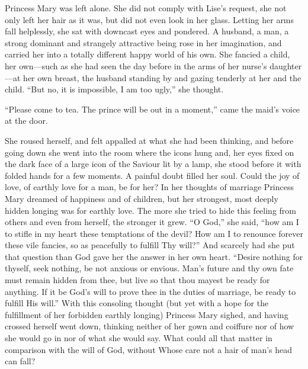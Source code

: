 Princess Mary was left alone. She did not comply with Lise's
request, she not only left her hair as it was, but did not even
look in her glass. Letting her arms fall helplessly, she sat with
downcast eyes and pondered. A husband, a man, a strong dominant
and strangely attractive being rose in her imagination, and
carried her into a totally different happy world of his own. She
fancied a child, her own---such as she had seen the day before in
the arms of her nurse's daughter---at her own breast, the husband
standing by and gazing tenderly at her and the child. ``But no,
it is impossible, I am too ugly,'' she thought.

``Please come to tea. The prince will be out in a moment,'' came
the maid's voice at the door.

She roused herself, and felt appalled at what she had been
thinking, and before going down she went into the room where the
icons hung and, her eyes fixed on the dark face of a large icon
of the Saviour lit by a lamp, she stood before it with folded
hands for a few moments. A painful doubt filled her soul. Could
the joy of love, of earthly love for a man, be for her? In her
thoughts of marriage Princess Mary dreamed of happiness and of
children, but her strongest, most deeply hidden longing was for
earthly love. The more she tried to hide this feeling from others
and even from herself, the stronger it grew. ``O God,'' she said,
``how am I to stifle in my heart these temptations of the devil?
How am I to renounce forever these vile fancies, so as peacefully
to fulfill Thy will?'' And scarcely had she put that question
than God gave her the answer in her own heart. ``Desire nothing
for thyself, seek nothing, be not anxious or envious. Man's
future and thy own fate must remain hidden from thee, but live so
that thou mayest be ready for anything. If it be God's will to
prove thee in the duties of marriage, be ready to fulfill His
will.'' With this consoling thought (but yet with a hope for the
fulfillment of her forbidden earthly longing) Princess Mary
sighed, and having crossed herself went down, thinking neither of
her gown and coiffure nor of how she would go in nor of what she
would say. What could all that matter in comparison with the will
of God, without Whose care not a hair of man's head can fall?


